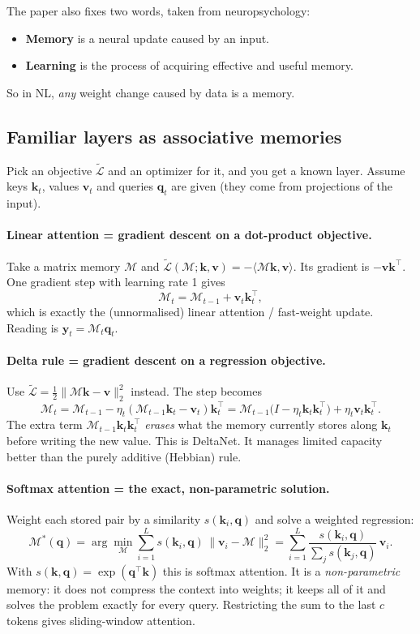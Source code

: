 \documentclass[11pt,a4paper]{article}
\newcommand{\M}{\mathcal{M}}
\newcommand{\Lt}{\tilde{\mathcal{L}}}
\newcommand{\bk}{\mathbf{k}}
\newcommand{\bv}{\mathbf{v}}
\newcommand{\bq}{\mathbf{q}}
\newcommand{\by}{\mathbf{y}}
\newcommand{\inner}[2]{\langle #1, #2\rangle}
\begin{document}
The paper also fixes two words, taken from neuropsychology:
\begin{itemize}
  \item \textbf{Memory} is a neural update caused by an input.
  \item \textbf{Learning} is the process of acquiring effective and useful memory.
\end{itemize}
So in NL, \emph{any} weight change caused by data is a memory.

\subsection{Familiar layers as associative memories}
Pick an objective $\Lt$ and an optimizer for it, and you get a known layer. Assume keys $\bk_t$, values $\bv_t$ and queries $\bq_t$ are given (they come from projections of the input).

\paragraph{Linear attention = gradient descent on a dot-product objective.}
Take a matrix memory $\M$ and $\Lt(\M;\bk,\bv) = -\inner{\M\bk}{\bv}$. Its gradient is $-\bv\bk^{\top}$. One gradient step with learning rate 1 gives
\begin{equation}
  \M_t = \M_{t-1} + \bv_t\bk_t^{\top},
\end{equation}
which is exactly the (unnormalised) linear attention / fast-weight update. Reading is $\by_t = \M_t\bq_t$.

\paragraph{Delta rule = gradient descent on a regression objective.}
Use $\Lt = \tfrac12\|\M\bk - \bv\|_2^2$ instead. The step becomes
\begin{equation}
  \M_t = \M_{t-1} - \eta_t(\M_{t-1}\bk_t - \bv_t)\bk_t^{\top}
       = \M_{t-1}\big(I - \eta_t\bk_t\bk_t^{\top}\big) + \eta_t\bv_t\bk_t^{\top}.
\end{equation}
The extra term $\M_{t-1}\bk_t\bk_t^{\top}$ \emph{erases} what the memory currently stores along $\bk_t$ before writing the new value. This is DeltaNet. It manages limited capacity better than the purely additive (Hebbian) rule.

\paragraph{Softmax attention = the exact, non-parametric solution.}
Weight each stored pair by a similarity $s(\bk_i,\bq)$ and solve a weighted regression:
\begin{equation}
  \M^{*}(\bq) = \arg\min_{\M}\sum_{i=1}^{L} s(\bk_i,\bq)\,\|\bv_i - \M\|_2^2
  = \sum_{i=1}^{L}\frac{s(\bk_i,\bq)}{\sum_{j} s(\bk_j,\bq)}\,\bv_i .
\end{equation}
With $s(\bk,\bq)=\exp(\bq^{\top}\bk)$ this is softmax attention. It is a \emph{non-parametric} memory: it does not compress the context into weights; it keeps all of it and solves the problem exactly for every query. Restricting the sum to the last $c$ tokens gives sliding-window attention.
\end{document}
